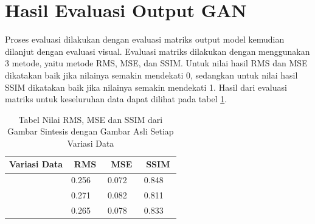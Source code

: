 \section{Hasil Evaluasi Output GAN}
\label{sec:evaluasiOutput}

Proses evaluasi dilakukan dengan evaluasi matriks output model kemudian dilanjut dengan evaluasi visual. 
Evaluasi matriks dilakukan dengan menggunakan 3 metode, yaitu metode RMS, MSE, dan SSIM. 
Untuk nilai hasil RMS dan MSE dikatakan baik jika nilainya semakin mendekati 0, sedangkan untuk nilai hasil SSIM dikatakan baik jika nilainya semakin mendekati 1. 
Hasil dari evaluasi matriks untuk keseluruhan data dapat dilihat pada tabel \ref{tb:evaluasimatriks}. 

\begin{table}[]
  \caption{Tabel Nilai RMS, MSE dan SSIM dari Gambar Sintesis dengan Gambar Asli Setiap Variasi Data}
  \label{tb:evaluasimatriks}
  \begin{tabular}{|l|cc|cc|cc|}
  \hline
  \multicolumn{1}{|c|}{Variasi Data}                  & \multicolumn{2}{c|}{RMS}                                                                               & \multicolumn{2}{c|}{MSE}                                                                                   & \multicolumn{2}{c|}{SSIM}                                                                            \\ \hline
                                                      & \multicolumn{1}{c|}{\cellcolor[HTML]{FFFFFF}0.256} & \cellcolor[HTML]{FFFFFF}                         & \multicolumn{1}{c|}{\cellcolor[HTML]{FFFFFF}0.072}  & \cellcolor[HTML]{FFFFFF}                           & \multicolumn{1}{c|}{\cellcolor[HTML]{FFFFFF}0.848} & \cellcolor[HTML]{FFFFFF}                        \\ \cline{2-2} \cline{4-4} \cline{6-6}
                                                      & \multicolumn{1}{c|}{\cellcolor[HTML]{FFFFFF}0.271} & \cellcolor[HTML]{FFFFFF}                         & \multicolumn{1}{c|}{\cellcolor[HTML]{FFFFFF}0.082}  & \cellcolor[HTML]{FFFFFF}                           & \multicolumn{1}{c|}{\cellcolor[HTML]{FFFFFF}0.811} & \cellcolor[HTML]{FFFFFF}                        \\ \cline{2-2} \cline{4-4} \cline{6-6}
                                                      & \multicolumn{1}{c|}{\cellcolor[HTML]{FFFFFF}0.265} & \cellcolor[HTML]{FFFFFF}                         & \multicolumn{1}{c|}{\cellcolor[HTML]{FFFFFF}0.078}  & \cellcolor[HTML]{FFFFFF}                           & \multicolumn{1}{c|}{\cellcolor[HTML]{FFFFFF}0.833} & \cellcolor[HTML]{FFFFFF}                        \\ \cline{2-2} \cline{4-4} \cline{6-6}

\end{tabular}
\end{table}
